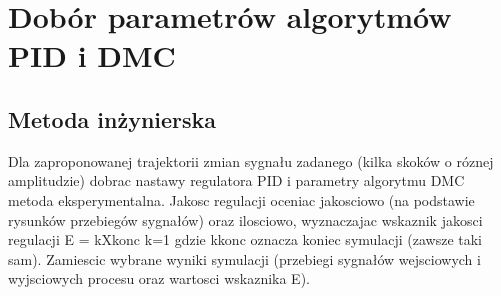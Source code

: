 \section{Dobór parametrów algorytmów PID i DMC}
\subsection{Metoda inżynierska}
Dla zaproponowanej trajektorii zmian sygnału zadanego (kilka skoków o róznej amplitudzie)
dobrac nastawy regulatora PID i parametry algorytmu DMC metoda eksperymentalna.
Jakosc regulacji oceniac jakosciowo (na podstawie rysunków przebiegów
sygnałów) oraz ilosciowo, wyznaczajac wskaznik jakosci regulacji
E =
kXkonc
k=1
gdzie kkonc oznacza koniec symulacji (zawsze taki sam). Zamiescic wybrane wyniki
symulacji (przebiegi sygnałów wejsciowych i wyjsciowych procesu oraz wartosci wskaznika
E).
